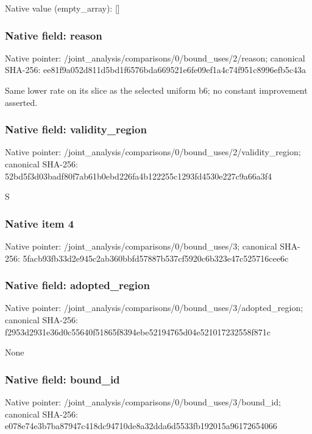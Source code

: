 \documentclass[10pt,a4paper]{article}
\begin{document}
Native value (empty\_\allowbreak{}array): []

\subsubsection{Native field: reason}
Native pointer: /joint\_\allowbreak{}analysis/comparisons/0/bound\_\allowbreak{}uses/2/reason; canonical SHA-256: ee81f9a052d811d5bd1f6576bda669521e6fe09ef1a4c74f951c8996efb5c43a

\begingroup\raggedright\sloppy Same lower rate on its slice as the selected uniform b6;\allowbreak{} no constant improvement asserted.\par\endgroup

\subsubsection{Native field: validity\_\allowbreak{}region}
Native pointer: /joint\_\allowbreak{}analysis/comparisons/0/bound\_\allowbreak{}uses/2/validity\_\allowbreak{}region; canonical SHA-256: 52bd5f3d03badf80f7ab61b0ebd226fa4b122255c1293fd4530e227c9a66a3f4

\begingroup\raggedright\sloppy S\par\endgroup

\subsubsection{Native item 4}
Native pointer: /joint\_\allowbreak{}analysis/comparisons/0/bound\_\allowbreak{}uses/3; canonical SHA-256: 5facb93fb33d2e945c2ab360bbfd57887b537cf5920c6b323e47c525716cee6c

\subsubsection{Native field: adopted\_\allowbreak{}region}
Native pointer: /joint\_\allowbreak{}analysis/comparisons/0/bound\_\allowbreak{}uses/3/adopted\_\allowbreak{}region; canonical SHA-256: f2953d2931e36d0c55640f51865f8394ebe52194765d04e521017232558f871c

\begingroup\raggedright\sloppy None\par\endgroup

\subsubsection{Native field: bound\_\allowbreak{}id}
Native pointer: /joint\_\allowbreak{}analysis/comparisons/0/bound\_\allowbreak{}uses/3/bound\_\allowbreak{}id; canonical SHA-256: e078e74e3b7ba87947c418dc94710de8a32dda6d5533fb192015a96172654066
\end{document}
